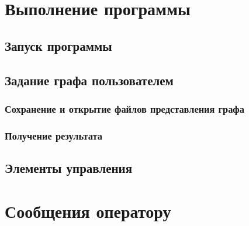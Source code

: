 \documentclass[a4paper,12pt]{article}
\begin{document}
    \section{Выполнение программы}

    \subsection{Запуск программы}

    \subsection{Задание графа пользователем}

    \subsubsection{Сохранение и открытие файлов представления графа}

    \subsubsection{Получение результата}

    \subsection{Элементы управления}

    \newpage


    \section{Сообщения оператору}

    \newpage
    \listRegistration
\end{document}
